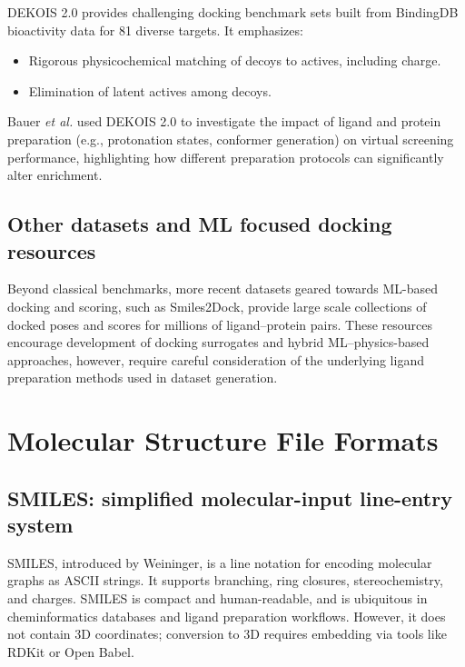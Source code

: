 \documentclass[12pt, a4paper]{article}
\begin{document}
DEKOIS 2.0 provides challenging docking benchmark sets built from BindingDB bioactivity data for 81 diverse targets.\cite{CH6_DEKOIS2} It emphasizes:
\begin{itemize}
  \item Rigorous physicochemical matching of decoys to actives, including charge.
  \item Elimination of latent actives among decoys.
\end{itemize}

Bauer \emph{et al.} used DEKOIS 2.0 to investigate the impact of ligand and protein preparation (e.g., protonation states, conformer generation) on virtual screening performance, highlighting how different preparation protocols can significantly alter enrichment.\cite{CH6_DEKOIS2,CH6_IbrahimDEKOIS}

\subsection{Other datasets and ML focused docking resources}

Beyond classical benchmarks, more recent datasets geared towards ML-based docking and scoring, such as Smiles2Dock, provide large scale collections of docked poses and scores for millions of ligand–protein pairs.\cite{CH6_Smiles2Dock} These resources encourage development of docking surrogates and hybrid ML--physics-based approaches, however, require careful consideration of the underlying ligand preparation methods used in dataset generation.

\section{Molecular Structure File Formats}

\subsection{SMILES: simplified molecular-input line-entry system}

SMILES, introduced by Weininger,\cite{CH6_Weininger1988,CH6_weininger1989smiles,CH6_weininger1990smiles} is a line notation for encoding molecular graphs as ASCII strings. It supports branching, ring closures, stereochemistry, and charges. SMILES is compact and human-readable, and is ubiquitous in cheminformatics databases and ligand preparation workflows. However, it does not contain 3D coordinates; conversion to 3D requires embedding via tools like RDKit or Open Babel.
\end{document}
